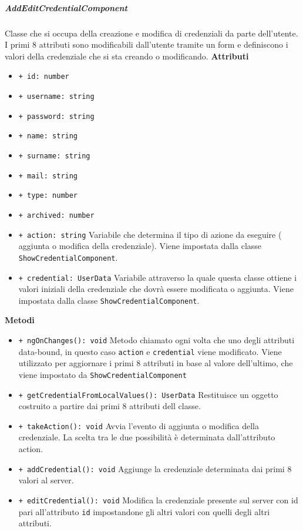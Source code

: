 \subparagraph{AddEditCredentialComponent}
Classe che si occupa della creazione e modifica di credenziali da parte dell'utente. I primi 8 attributi sono modificabili dall'utente tramite un form e definiscono i valori della credenziale che si sta creando o modificando. \newline
\textbf{Attributi}
\begin{itemize}
	\item \texttt{+ id: number}
	\item \texttt{+ username: string}
	\item \texttt{+ password: string}
	\item \texttt{+ name: string}
	\item \texttt{+ surname: string}
	\item \texttt{+ mail: string}
	\item \texttt{+ type: number}
	\item \texttt{+ archived: number}
	\item \texttt{+ action: string} \newline
	Variabile che determina il tipo di azione da eseguire ( aggiunta o modifica della credenziale). Viene impostata dalla classe \texttt{ShowCredentialComponent}.
	\item \texttt{+ credential: UserData} \newline
	Variabile attraverso la quale questa classe ottiene i valori iniziali della credenziale che dovrà essere modificata o aggiunta. Viene impostata dalla classe \texttt{ShowCredentialComponent}.
\end{itemize}
\textbf{Metodi}
\begin{itemize}
	\item \texttt{+ ngOnChanges(): void} \newline
	Metodo chiamato ogni volta che uno degli attributi data-bound, in questo caso \texttt{action} e \texttt{credential} viene modificato. Viene utilizzato per aggiornare i primi 8 attributi in base al valore dell'ultimo, che viene impostato da \texttt{ShowCredentialComponent}
	\item \texttt{+ getCredentialFromLocalValues(): UserData} \newline
	Restituisce un oggetto costruito a partire dai primi 8 attributi dell classe.
	\item \texttt{+ takeAction(): void} \newline
	Avvia l'evento di aggiunta o modifica della credenziale. La scelta tra le due possibilità è determinata dall'attributo action.
	\item \texttt{+ addCredential(): void} \newline
	Aggiunge la credenziale determinata dai primi 8 valori al server.
	\item \texttt{+ editCredential(): void} \newline
	Modifica la credenziale presente sul server con id pari all'attributo \texttt{id} impostandone gli altri valori con quelli degli altri attributi.
\end{itemize}
